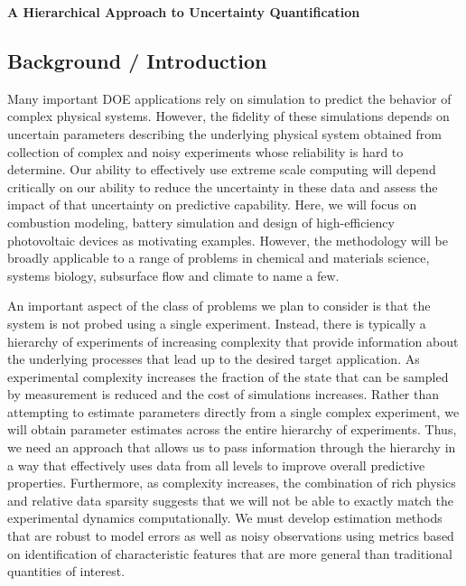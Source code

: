 \documentclass[11pt]{article}
\newcommand{\MarginPar}[1]{\marginpar{%
\vskip-\baselineskip %
\raggedright\tiny\sffamily
\hrule\smallskip{\color{red}#1}\par\smallskip\hrule}}
\begin{document}
\begin{center}
{\large{\textbf{A Hierarchical Approach to Uncertainty Quantification}}}
\end{center}

\subsection*{Background / Introduction}

Many important DOE applications rely on simulation to predict the behavior of complex physical systems.
However, the fidelity of these simulations depends on uncertain parameters describing the underlying physical system
obtained from collection of
complex and noisy experiments whose reliability is hard to determine. 
Our ability to effectively use extreme scale computing will depend critically on our ability to reduce the
uncertainty in these data and assess the impact of that uncertainty on predictive capability.
Here, we will focus on combustion modeling, battery simulation and design of high-efficiency photovoltaic
devices as motivating examples.
\MarginPar{a bit more detail here?}
However, the methodology will be broadly applicable to a
range of problems in chemical and materials science, systems biology, subsurface flow and climate to name a
few.

An important aspect of the class of problems we plan to consider is that 
the system is not probed using a single experiment.  Instead,
there is typically a hierarchy
of experiments of increasing complexity that provide information about the underlying processes
that lead up to the desired target application.
As experimental complexity increases the fraction of the state that can be sampled
by measurement is reduced and the cost of simulations increases.
Rather than attempting to estimate parameters directly from a single complex experiment, we 
will obtain parameter estimates across the entire hierarchy of experiments.
Thus, we need an approach that allows us to pass
information through the hierarchy in a way that effectively uses data from all levels
to improve overall predictive properties.
Furthermore, as complexity increases,
the combination of rich physics and relative data sparsity suggests that we will not be
able to exactly match the experimental dynamics computationally.
We must develop estimation methods that are robust to model errors as well as noisy observations
using metrics based on identification of characteristic features that are more general than
traditional quantities of interest.
\end{document}
